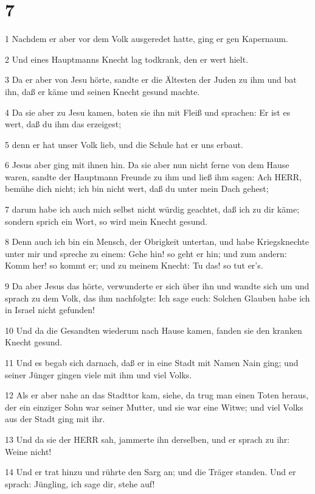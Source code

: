 \chapter{7}

\par 1 Nachdem er aber vor dem Volk ausgeredet hatte, ging er gen Kapernaum.
\par 2 Und eines Hauptmanns Knecht lag todkrank, den er wert hielt.
\par 3 Da er aber von Jesu hörte, sandte er die Ältesten der Juden zu ihm und bat ihn, daß er käme und seinen Knecht gesund machte.
\par 4 Da sie aber zu Jesu kamen, baten sie ihn mit Fleiß und sprachen: Er ist es wert, daß du ihm das erzeigest;
\par 5 denn er hat unser Volk lieb, und die Schule hat er uns erbaut.
\par 6 Jesus aber ging mit ihnen hin. Da sie aber nun nicht ferne von dem Hause waren, sandte der Hauptmann Freunde zu ihm und ließ ihm sagen: Ach HERR, bemühe dich nicht; ich bin nicht wert, daß du unter mein Dach gehest;
\par 7 darum habe ich auch mich selbst nicht würdig geachtet, daß ich zu dir käme; sondern sprich ein Wort, so wird mein Knecht gesund.
\par 8 Denn auch ich bin ein Mensch, der Obrigkeit untertan, und habe Kriegsknechte unter mir und spreche zu einem: Gehe hin! so geht er hin; und zum andern: Komm her! so kommt er; und zu meinem Knecht: Tu das! so tut er's.
\par 9 Da aber Jesus das hörte, verwunderte er sich über ihn und wandte sich um und sprach zu dem Volk, das ihm nachfolgte: Ich sage euch: Solchen Glauben habe ich in Israel nicht gefunden!
\par 10 Und da die Gesandten wiederum nach Hause kamen, fanden sie den kranken Knecht gesund.
\par 11 Und es begab sich darnach, daß er in eine Stadt mit Namen Nain ging; und seiner Jünger gingen viele mit ihm und viel Volks.
\par 12 Als er aber nahe an das Stadttor kam, siehe, da trug man einen Toten heraus, der ein einziger Sohn war seiner Mutter, und sie war eine Witwe; und viel Volks aus der Stadt ging mit ihr.
\par 13 Und da sie der HERR sah, jammerte ihn derselben, und er sprach zu ihr: Weine nicht!
\par 14 Und er trat hinzu und rührte den Sarg an; und die Träger standen. Und er sprach: Jüngling, ich sage dir, stehe auf!

